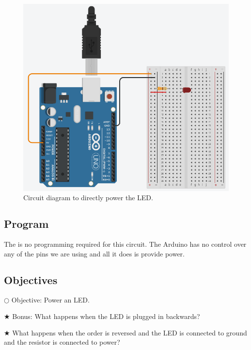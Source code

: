 \documentclass[12pt]{article}
\begin{document}
	\begin{figure}[H]
		\begin{center}
			\includegraphics[scale=0.5]{LED_simple}
			\caption{Circuit diagram to directly power the LED.}
			\label{fig:circuit_simple}
		\end{center}
	\end{figure}

	\subsection{Program}
	
	The is no programming required for this circuit. The Arduino has no control over any of the pins we are using and all it does is provide power.
	
	\subsection{Objectives}
	
	\noindent $\bigcirc$ Objective: Power an LED.
	
	\noindent $\bigstar$ Bonus: What happens when the LED is plugged in backwards?
	
	\indent $\bigstar$ What happens when the order is reversed and the LED is connected to ground and the resistor is connected to power?
	
	
	
	
	
\end{document}
